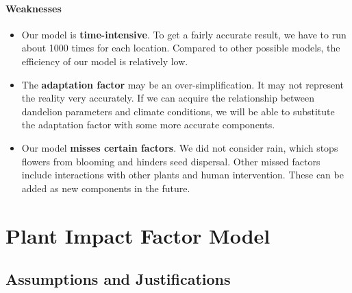 \documentclass[12pt]{article}
\begin{document}
			\paragraph{Weaknesses}
			\vspace{-0.5cm}
			\begin{itemize}
				\vspace{-0.3cm}
				\item Our model is \textbf{time-intensive}.  To get a fairly accurate result, we have to run about 1000 times for each location.  Compared to other possible models, the efficiency of our model is relatively low.
				
				\vspace{-0.3cm}
				\item The \textbf{adaptation factor} may be an over-simplification.  It may not represent the reality very accurately.  If we can acquire the relationship between dandelion parameters and climate conditions, we will be able to substitute the adaptation factor with some more accurate components.
				
				\vspace{-0.3cm}
				\item Our model \textbf{misses certain factors}.  We did not consider rain, which stops flowers from blooming and hinders seed dispersal.  Other missed factors include interactions with other plants and human intervention.  These can be added as new components in the future.
				
			\end{itemize}

		
		
		
		
\section{Plant Impact Factor Model}

	\subsection{Assumptions and Justifications}
	
\end{document}
